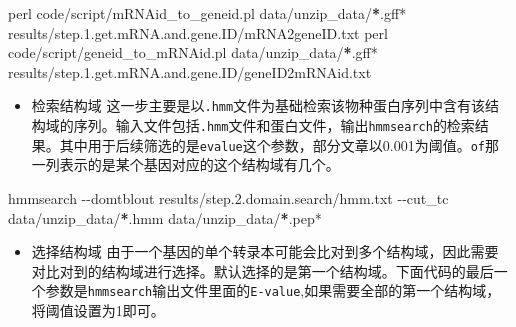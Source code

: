 \documentclass[
  10pt,
]{book}
\newenvironment{Shaded}{\begin{snugshade}}{\end{snugshade}}
\newcommand{\ErrorTok}[1]{\textcolor[rgb]{0.64,0.00,0.00}{\textbf{#1}}}
\newcommand{\FloatTok}[1]{\textcolor[rgb]{0.00,0.00,0.81}{#1}}
\newcommand{\NormalTok}[1]{#1}
\newcommand{\SpecialCharTok}[1]{\textcolor[rgb]{0.00,0.00,0.00}{#1}}
\providecommand{\tightlist}{%
  \setlength{\itemsep}{0pt}\setlength{\parskip}{0pt}}
\begin{document}
\begin{Shaded}
\begin{Highlighting}[]
\NormalTok{perl code}\SpecialCharTok{/}\NormalTok{script}\SpecialCharTok{/}\NormalTok{mRNAid\_to\_geneid.pl data}\SpecialCharTok{/}\NormalTok{unzip\_data}\SpecialCharTok{/}\ErrorTok{*}\NormalTok{.gff}\SpecialCharTok{*}\NormalTok{ results}\SpecialCharTok{/}\NormalTok{step.}\FloatTok{1.}\NormalTok{get.mRNA.and.gene.ID}\SpecialCharTok{/}\NormalTok{mRNA2geneID.txt}
\NormalTok{perl code}\SpecialCharTok{/}\NormalTok{script}\SpecialCharTok{/}\NormalTok{geneid\_to\_mRNAid.pl data}\SpecialCharTok{/}\NormalTok{unzip\_data}\SpecialCharTok{/}\ErrorTok{*}\NormalTok{.gff}\SpecialCharTok{*}\NormalTok{ results}\SpecialCharTok{/}\NormalTok{step.}\FloatTok{1.}\NormalTok{get.mRNA.and.gene.ID}\SpecialCharTok{/}\NormalTok{geneID2mRNAid.txt}
\end{Highlighting}
\end{Shaded}

\begin{itemize}
\tightlist
\item
  检索结构域
  这一步主要是以\texttt{.hmm}文件为基础检索该物种蛋白序列中含有该结构域的序列。输入文件包括\texttt{.hmm}文件和蛋白文件，输出\texttt{hmmsearch}的检索结果。其中用于后续筛选的是\texttt{evalue}这个参数，部分文章以0.001为阈值。\texttt{of}那一列表示的是某个基因对应的这个结构域有几个。
\end{itemize}

\begin{Shaded}
\begin{Highlighting}[]
\NormalTok{hmmsearch }\SpecialCharTok{{-}{-}}\NormalTok{domtblout results}\SpecialCharTok{/}\NormalTok{step.}\FloatTok{2.}\NormalTok{domain.search}\SpecialCharTok{/}\NormalTok{hmm.txt }\SpecialCharTok{{-}{-}}\NormalTok{cut\_tc data}\SpecialCharTok{/}\NormalTok{unzip\_data}\SpecialCharTok{/}\ErrorTok{*}\NormalTok{.hmm data}\SpecialCharTok{/}\NormalTok{unzip\_data}\SpecialCharTok{/}\ErrorTok{*}\NormalTok{.pep}\SpecialCharTok{*}
\end{Highlighting}
\end{Shaded}

\begin{itemize}
\tightlist
\item
  选择结构域
  由于一个基因的单个转录本可能会比对到多个结构域，因此需要对比对到的结构域进行选择。默认选择的是第一个结构域。下面代码的最后一个参数是\texttt{hmmsearch}输出文件里面的\texttt{E-value},如果需要全部的第一个结构域，将阈值设置为1即可。
\end{itemize}
\end{document}

